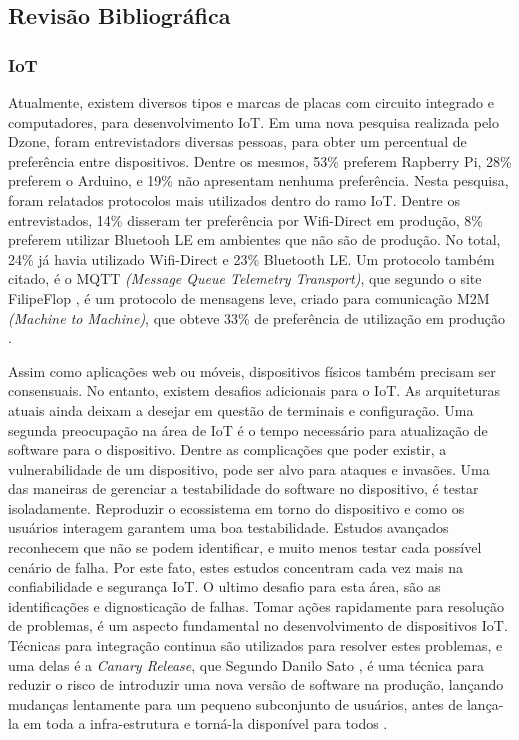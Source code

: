 \documentclass[journal]{IEEEtran}
\begin{document}

\subsection{Revisão Bibliográfica}
\subsubsection{IoT}

Atualmente, existem diversos tipos e marcas de placas com circuito integrado e computadores, para desenvolvimento IoT. Em uma nova pesquisa realizada pelo Dzone, foram entrevistadors diversas pessoas, para obter um percentual de preferência entre dispositivos. Dentre os mesmos, 53\% preferem Rapberry Pi, 28\% preferem o Arduino, e 19\% não apresentam nenhuma preferência. Nesta pesquisa, foram relatados protocolos mais utilizados dentro do ramo IoT. Dentre os entrevistados, 14\% disseram ter preferência por Wifi-Direct em produção, 8\% preferem utilizar Bluetooh LE em ambientes que não são de produção. No total, 24\% já havia utilizado Wifi-Direct e 23\% Bluetooth LE. Um protocolo também citado, é o MQTT \emph{(Message Queue Telemetry Transport)}, que segundo o site FilipeFlop \cite{filipeflopnodemcu}, é um protocolo de mensagens leve, criado para comunicação M2M \emph{(Machine to Machine)}, que obteve 33\% de preferência de utilização em produção \cite[p.~4]{dzoneiotvolume4}.

Assim como aplicações web ou móveis, dispositivos físicos também precisam ser consensuais. No entanto, existem desafios adicionais para o IoT. As arquiteturas atuais ainda deixam a desejar em questão de terminais e configuração. Uma segunda preocupação na área de IoT é o tempo necessário para atualização de software para o dispositivo. Dentre as complicações que poder existir, a vulnerabilidade de um dispositivo, pode ser alvo para ataques e invasões. Uma das maneiras de gerenciar a testabilidade do software no dispositivo, é testar isoladamente. Reproduzir o ecossistema em torno do dispositivo e como os usuários interagem garantem uma boa testabilidade. Estudos avançados reconhecem que não se podem identificar, e muito menos testar cada possível cenário de falha. Por este fato, estes estudos concentram cada vez mais na confiabilidade e segurança IoT. O ultimo desafio para esta área, são as identificações e dignosticação de falhas. Tomar ações rapidamente para resolução de problemas, é um aspecto fundamental no desenvolvimento de dispositivos IoT. Técnicas para integração continua são utilizados para resolver estes problemas, e uma delas é a \emph{Canary Release}, que Segundo Danilo Sato \cite{danilosato2017}, é uma técnica para reduzir o risco de introduzir uma nova versão de software na produção, lançando mudanças lentamente para um pequeno subconjunto de usuários, antes de lança-la em toda a infra-estrutura e torná-la disponível para todos \cite[p.~9]{dzoneiotvolume4}.
\end{document}
